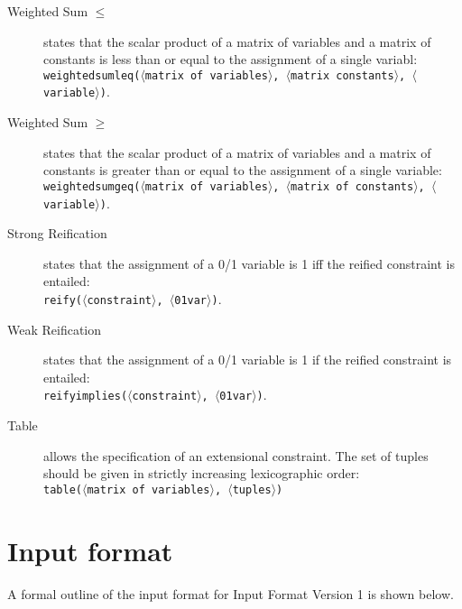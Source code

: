 \documentclass{article}
\begin{document}
\begin{small}
\begin{description}
\item[Weighted Sum $\mathbf{\leq}$] states that the scalar product of
a matrix of variables and a matrix of constants is less than or equal
to the assignment of a single variabl:\\
\texttt{weightedsumleq($\langle$matrix of variables$\rangle$,
$\langle$matrix constants$\rangle$, $\langle$variable$\rangle$)}.

\item[Weighted Sum $\mathbf{\geq}$] states that the scalar product of
a matrix of variables and a matrix of constants is greater than or
equal to the assignment of a single variable:\\
\texttt{weightedsumgeq($\langle$matrix of variables$\rangle$,
$\langle$matrix of constants$\rangle$, $\langle$variable$\rangle$)}.

\item[Strong Reification] states that the assignment of a 0/1 variable
is 1 iff the reified constraint is entailed:\\
\texttt{reify($\langle$constraint$\rangle$, $\langle$01var$\rangle$)}.

\item[Weak Reification] states that the assignment of a 0/1 variable
is 1 if the reified constraint is entailed:\\
\texttt{reifyimplies($\langle$constraint$\rangle$, $\langle$01var$\rangle$)}.

\item[Table] allows the specification of an extensional constraint. The
set of tuples should be given in strictly increasing lexicographic order:\\
\texttt{table($\langle$matrix of variables$\rangle$, $\langle$tuples$\rangle$)}

\end{description}

\clearpage
\section{Input format}

A formal outline of the input format for Input Format Version 1 is shown below.


\end{small}
\end{document}
